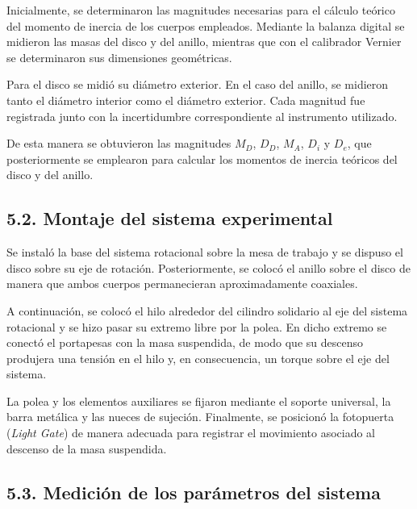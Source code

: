 \documentclass[11pt,a4paper]{article}
\begin{document}
Inicialmente, se determinaron las magnitudes necesarias para el cálculo
teórico del momento de inercia de los cuerpos empleados. Mediante la
balanza digital se midieron las masas del disco y del anillo, mientras
que con el calibrador Vernier se determinaron sus dimensiones geométricas.

Para el disco se midió su diámetro exterior. En el caso del anillo, se
midieron tanto el diámetro interior como el diámetro exterior. Cada
magnitud fue registrada junto con la incertidumbre correspondiente al
instrumento utilizado.

De esta manera se obtuvieron las magnitudes \(M_D\), \(D_D\), \(M_A\),
\(D_i\) y \(D_e\), que posteriormente se emplearon para calcular los
momentos de inercia teóricos del disco y del anillo.



\subsection*{5.2. Montaje del sistema experimental}

Se instaló la base del sistema rotacional sobre la mesa de trabajo y se
dispuso el disco sobre su eje de rotación. Posteriormente, se colocó el
anillo sobre el disco de manera que ambos cuerpos permanecieran
aproximadamente coaxiales.

A continuación, se colocó el hilo alrededor del cilindro solidario al
eje del sistema rotacional y se hizo pasar su extremo libre por la polea.
En dicho extremo se conectó el portapesas con la masa suspendida, de modo
que su descenso produjera una tensión en el hilo y, en consecuencia, un
torque sobre el eje del sistema.

La polea y los elementos auxiliares se fijaron mediante el soporte
universal, la barra metálica y las nueces de sujeción. Finalmente, se
posicionó la fotopuerta (\textit{Light Gate}) de manera adecuada para
registrar el movimiento asociado al descenso de la masa suspendida.



\subsection*{5.3. Medición de los parámetros del sistema}
\end{document}
